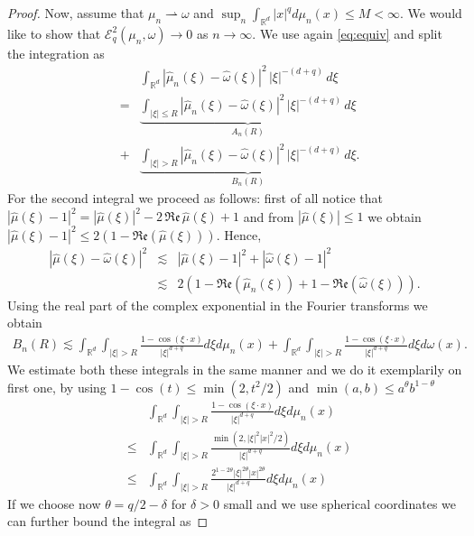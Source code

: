 \documentclass[12pt,a4paper,oneside]{amsart}
\theoremstyle{plain}
\theoremstyle{definition}
\numberwithin{equation}{section}
\numberwithin{figure}{section}
\numberwithin{table}{section}
\theoremstyle{remark}
\newcommand{\R}{\mathbb{R}}
\begin{document}
\begin{proof}
    Now, assume that $\mu_n \rightharpoonup \omega$ and $\sup_n \int_{\R^d} |x|^q d\mu_n(x) \leq M <\infty$. We would like to show that $\mathcal E_q^2(\mu_n,\omega) \to 0$ as $n\to \infty$. We use again \eqref{eq:equiv} and split the integration as
    \begin{eqnarray*}
     && \int_{\R^d}
  |\hat{\mu}_n(\xi) - \hat{\omega}(\xi)|^2
  \,|\xi|^{-(d+q)}\, d\xi \\
  &=& \underbrace{\int_{|\xi|\leq R}
  |\hat{\mu}_n(\xi) - \hat{\omega}(\xi)|^2
  \,|\xi|^{-(d+q)}\, d\xi}_{A_n(R)} \\
  &+&  \underbrace{\int_{|\xi|> R}
  |\hat{\mu}_n(\xi) - \hat{\omega}(\xi)|^2
  \,|\xi|^{-(d+q)}\, d\xi}_{B_n(R)}.   
    \end{eqnarray*}
    For the second integral we proceed as follows: first of all notice that
    $|\hat\mu(\xi) - 1|^2 = |\hat\mu(\xi)|^2 - 2\,\mathfrak{Re}\,\hat\mu(\xi) + 1$ and from $|\hat\mu(\xi)| \leq 1$ we obtain
    $ |\hat\mu(\xi) - 1|^2 \leq 2(1-\mathfrak{Re}(\hat \mu(\xi)))$. Hence,
    \begin{eqnarray*}
    |\hat{\mu}(\xi) - \hat{\omega}(\xi)|^2 &\lesssim& |\hat{\mu}(\xi) -1 |^2 + |\hat{\omega}(\xi) -1 |^2 \\
    &\lesssim& 2 (1 - \mathfrak{Re}(\hat \mu_n(\xi)) + 1 - \mathfrak{Re}(\hat \omega(\xi))).
    \end{eqnarray*}
    Using the real part of the complex exponential in the Fourier transforms we obtain
    \begin{eqnarray*}
B_n(R) \lesssim \int_{\R^d} \int_{|\xi|> R} \frac{1-\cos(\xi \cdot x)}{|\xi|^{d+q}} d\xi d \mu_n(x) + \int_{\R^d} \int_{|\xi|> R} \frac{1-\cos(\xi \cdot x)}{|\xi|^{d+q}} d\xi d \omega(x).
     \end{eqnarray*}
     We estimate both these integrals in the same manner and we do it exemplarily on first one, by using $1- \cos(t) \leq \min(2,t^2/2)$ and $\min(a,b) \leq a^\theta b^{1-\theta}$
      \begin{eqnarray*}
      && \int_{\R^d} \int_{|\xi|> R} \frac{1-\cos(\xi \cdot x)}{|\xi|^{d+q}} d\xi d \mu_n(x) \\
      &\leq& \int_{\R^d} \int_{|\xi|> R} \frac{\min(2,|\xi|^2|x|^2/2)}{|\xi|^{d+q}} d\xi d \mu_n(x) \\
      &\leq &
      \int_{\R^d} \int_{|\xi|> R} \frac{2^{1-2 \theta}|\xi|^{2\theta} |x|^{2\theta}}{|\xi|^{d+q}} d\xi d \mu_n(x)
       \end{eqnarray*}
       If we choose now $\theta=q/2- \delta$ for $\delta>0$ small and we use spherical coordinates we can further bound the integral as

\end{proof}
\end{document}
